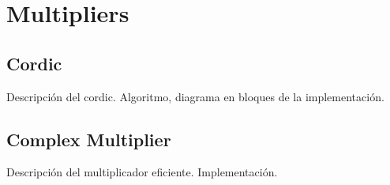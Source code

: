 \section{Multipliers}
\subsection{Cordic}
Descripción del cordic. Algoritmo, diagrama en bloques de la implementación.
\subsection{Complex Multiplier}
Descripción del multiplicador eficiente. Implementación.